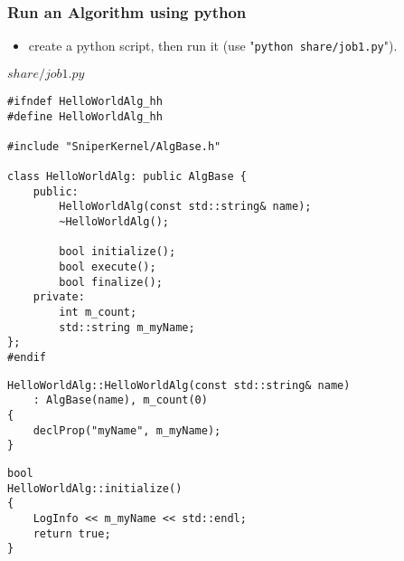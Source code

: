 \begin{frame}
    \frametitle{Run an Algorithm using python}
    \begin{itemize}
        \item create a python script, then run it
            (use "{\tt python share/job1.py}").
    \end{itemize}
    \begin{block}{\(share/job1.py\)}
        \par\usebox{\runalg}
    \end{block}
\end{frame}

\newsavebox{\createalgpropheader}
\begin{lrbox}{\createalgpropheader}
\begin{lstlisting}[linebackgroundcolor={\ifnum\value{lstnumber}=16\color{green}\fi}]
#ifndef HelloWorldAlg_hh
#define HelloWorldAlg_hh

#include "SniperKernel/AlgBase.h"

class HelloWorldAlg: public AlgBase {
    public:
        HelloWorldAlg(const std::string& name);
        ~HelloWorldAlg();

        bool initialize();
        bool execute();
        bool finalize();
    private:
        int m_count;
        std::string m_myName;
};
#endif
\end{lstlisting}
\end{lrbox}
\newsavebox{\createalgpropsrcctor}
\begin{lrbox}{\createalgpropsrcctor}
\begin{lstlisting}[linebackgroundcolor={\ifnum\value{lstnumber}=4\color{green}\fi}]
HelloWorldAlg::HelloWorldAlg(const std::string& name)
    : AlgBase(name), m_count(0)
{
    declProp("myName", m_myName);
}
\end{lstlisting}
\end{lrbox}
\newsavebox{\createalgpropsrcexecute}
\begin{lrbox}{\createalgpropsrcexecute}
\begin{lstlisting}
bool
HelloWorldAlg::initialize()
{
    LogInfo << m_myName << std::endl;
    return true;
}
\end{lstlisting}
\end{lrbox}
\newsavebox{\createalgproppy}

